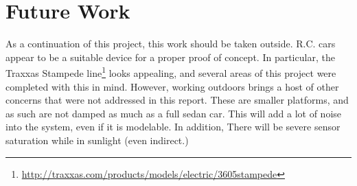 \chapter{Future Work}
As a continuation of this project, this work should be taken outside. R.C. cars appear to be a suitable device for a proper proof of concept. In particular, the Traxxas Stampede line\footnote{\url{http://traxxas.com/products/models/electric/3605stampede}} looks appealing, and several areas of this project were completed with this in mind. However, working outdoors brings a host of other concerns that were not addressed in this report. These are smaller platforms, and as such are not damped as much as a full sedan car. This will add a lot of noise into the system, even if it is modelable. In addition, There will be severe sensor saturation while in sunlight (even indirect.)

